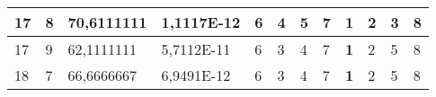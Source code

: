 \documentclass[conference]{IEEEtran}
\begin{document}
\begin{table*}[]
\begin{tabular}{|llll|llllllll|}
\multicolumn{1}{|l|}{17}                                                    & \multicolumn{1}{l|}{8}                                                        & \multicolumn{1}{l|}{70,6111111}                                                   & 1,1117E-12                     & \multicolumn{1}{l|}{6}                                                  & \multicolumn{1}{l|}{4}                                                  & \multicolumn{1}{l|}{5}                                                  & \multicolumn{1}{l|}{7}                                                  & \multicolumn{1}{l|}{\textbf{1}}                                         & \multicolumn{1}{l|}{2}                                                  & \multicolumn{1}{l|}{3}                                                  & 8                          \\ \hline
\multicolumn{1}{|l|}{17}                                                    & \multicolumn{1}{l|}{9}                                                        & \multicolumn{1}{l|}{62,1111111}                                                   & 5,7112E-11                     & \multicolumn{1}{l|}{6}                                                  & \multicolumn{1}{l|}{3}                                                  & \multicolumn{1}{l|}{4}                                                  & \multicolumn{1}{l|}{7}                                                  & \multicolumn{1}{l|}{\textbf{1}}                                         & \multicolumn{1}{l|}{2}                                                  & \multicolumn{1}{l|}{5}                                                  & 8                          \\ \hline
\multicolumn{1}{|l|}{18}                                                    & \multicolumn{1}{l|}{7}                                                        & \multicolumn{1}{l|}{66,6666667}                                                   & 6,9491E-12                     & \multicolumn{1}{l|}{6}                                                  & \multicolumn{1}{l|}{3}                                                  & \multicolumn{1}{l|}{4}                                                  & \multicolumn{1}{l|}{7}                                                  & \multicolumn{1}{l|}{\textbf{1}}                                         & \multicolumn{1}{l|}{2}                                                  & \multicolumn{1}{l|}{5}                                                  & 8                          \\ \hline

\end{tabular}
\end{table*}
\end{document}
